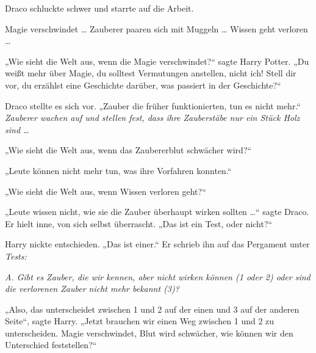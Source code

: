 Draco schluckte schwer und starrte auf die Arbeit.

Magie verschwindet … Zauberer paaren sich mit Muggeln … Wissen geht verloren …

„Wie sieht die Welt aus, wenn die Magie verschwindet?“ sagte Harry Potter.
„Du weißt mehr über Magie, du solltest Vermutungen anstellen, nicht ich! Stell dir vor, du erzählst eine Geschichte darüber, was passiert in der Geschichte?“

Draco stellte es sich vor.
„Zauber die früher funktionierten, tun es nicht mehr.“ \emph{Zauberer wachen auf und stellen fest, dass ihre Zauberstäbe nur ein Stück Holz sind …}

„Wie sieht die Welt aus, wenn das Zaubererblut schwächer wird?“

„Leute können nicht mehr tun, was ihre Vorfahren konnten.“

„Wie sieht die Welt aus, wenn Wissen verloren geht?“

„Leute wissen nicht, wie sie die Zauber überhaupt wirken sollten …“ sagte Draco. Er hielt inne, von sich selbst überrascht.
„Das ist ein Test, oder nicht?“

Harry nickte entschieden.
„Das ist einer.“ Er schrieb ihn auf das Pergament unter \emph{Tests:}

\emph{A. Gibt es Zauber, die wir kennen, aber nicht wirken können (1 oder 2) oder sind die verlorenen Zauber nicht mehr bekannt (3)?}

„Also, das unterscheidet zwischen 1 und 2 auf der einen und 3 auf der anderen Seite“, sagte Harry.
„Jetzt brauchen wir einen Weg zwischen 1 und 2 zu unterscheiden. Magie verschwindet, Blut wird schwächer, wie können wir den Unterschied feststellen?“

